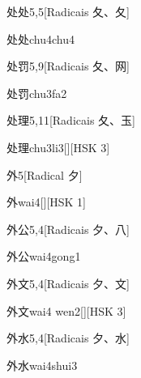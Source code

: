 \begin{entry}{处处}{5,5}[Radicais ⼡、⼡]
  \begin{phonetics}{处处}{chu4chu4}
  \end{phonetics}
\end{entry}

\begin{entry}{处罚}{5,9}[Radicais ⼡、⽹]
  \begin{phonetics}{处罚}{chu3fa2}
  \end{phonetics}
\end{entry}

\begin{entry}{处理}{5,11}[Radicais ⼡、⽟]
  \begin{phonetics}{处理}{chu3li3}[][HSK 3]
  \end{phonetics}
\end{entry}

\begin{entry}{外}{5}[Radical ⼣]
  \begin{phonetics}{外}{wai4}[][HSK 1]
  \end{phonetics}
\end{entry}

\begin{entry}{外公}{5,4}[Radicais ⼣、⼋]
  \begin{phonetics}{外公}{wai4gong1}
  \end{phonetics}
\end{entry}

\begin{entry}{外文}{5,4}[Radicais ⼣、⽂]
  \begin{phonetics}{外文}{wai4 wen2}[][HSK 3]
  \end{phonetics}
\end{entry}

\begin{entry}{外水}{5,4}[Radicais ⼣、⽔]
  \begin{phonetics}{外水}{wai4shui3}
  \end{phonetics}
\end{entry}

